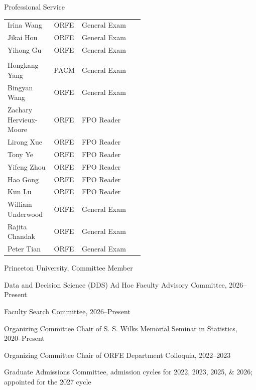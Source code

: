 \documentclass{resume}
\begin{document}
\begin{rSection}{Professional Service}
\begin{longtable}{@{}>{\raggedright\arraybackslash}p{0.34\linewidth}>{\raggedright\arraybackslash}p{0.20\linewidth}>{\raggedright\arraybackslash}p{}@{}}
Irina Wang & ORFE & General Exam \\
Jikai Hou & ORFE & General Exam \\
Yihong Gu & ORFE & General Exam \\
\multicolumn{3}{@{}l}{\textbf{2021}} \\*[2pt]
Hongkang Yang & PACM & General Exam \\
Bingyan Wang & ORFE & General Exam \\
Zachary Hervieux-Moore & ORFE & FPO Reader \\
Lirong Xue & ORFE & FPO Reader \\
Tony Ye & ORFE & FPO Reader \\
Yifeng Zhou & ORFE & FPO Reader \\
Hao Gong & ORFE & FPO Reader \\
Kun Lu & ORFE & FPO Reader \\
William Underwood & ORFE & General Exam \\
Rajita Chandak & ORFE & General Exam \\
Peter Tian & ORFE & General Exam \\
\end{longtable}
\endgroup


\begin{rSubsection}{Princeton University, Committee Member}{}{}{}
\item {Data and Decision Science (DDS) Ad Hoc Faculty Advisory Committee, 2026--Present}
\item {Faculty Search Committee, 2026--Present}
\item {Organizing Committee Chair of S. S. Wilks Memorial Seminar in Statistics, 2020--Present}
\item {Organizing Committee Chair of ORFE Department Colloquia, 2022--2023}
\item {Graduate Admissions Committee, admission cycles for 2022, 2023, 2025, \& 2026; appointed for the 2027 cycle}
\end{rSubsection}


\end{rSection}
\end{document}
